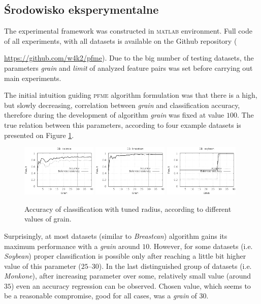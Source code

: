 \documentclass[]{article}
\begin{document}
\subsection{Środowisko eksperymentalne}

The experimental framework was constructed in \textsc{matlab} environment. Full code of all experiments, with all datasets is available on the Github repository ({\url{https://github.com/w4k2/pfme}). Due to the big number of testing datasets, the parameters  \emph{grain} and \emph{limit} of analyzed feature  pairs was set before carrying out main experiments.

The initial intuition guiding \textsc{pfme} algorithm formulation was that there is a high, but slowly decreasing, correlation between \emph{grain} and classification accuracy, therefore during the development of algorithm \emph{grain} was fixed at value $100$. The true relation between this parameters, according to four example datasets is presented on Figure \ref{fig:grain}.

\begin{figure}[!ht]
  \includegraphics[width=0.32\textwidth]{figures/grain_balance}
  \includegraphics[width=0.32\textwidth]{figures/grain_breastcan}
  \includegraphics[width=0.32\textwidth]{figures/grain_soybean}
  
  \caption{Accuracy of classification with tuned radius, according to different values of grain.}
	\label{fig:grain}
\end{figure}

Surprisingly, at most datasets (similar to \emph{Breastcan}) algorithm gains its maximum performance with a \emph{grain} around $10$. However, for some datasets (i.e. \emph{Soybean}) proper classification is possible only after reaching a little bit higher value of this parameter ($25$--$30$). In the last distinguished group of datasets (i.e. \emph{Monkone}), after increasing parameter over some, relatively small value (around $35$) even an accuracy regression can be observed. Chosen value, which seems to be a reasonable compromise, good for all cases, was a \emph{grain} of $30$. 

}
\end{document}
